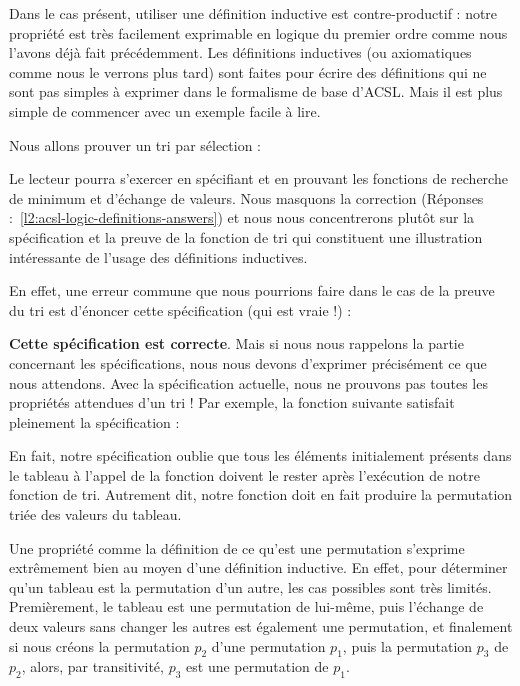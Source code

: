 Dans le cas présent, utiliser une définition inductive est contre-productif :
notre propriété est très facilement exprimable en logique du premier ordre comme
nous l'avons déjà fait précédemment. Les définitions inductives (ou axiomatiques
comme nous le verrons plus tard) sont faites pour écrire des définitions qui ne
sont pas simples à exprimer dans le formalisme de base d'ACSL. Mais il est plus
simple de commencer avec un exemple facile à lire.




\label{l3:acsl-logic-definitions-inductive-sort}




Nous allons prouver un tri par sélection :





Le lecteur pourra s'exercer en spécifiant et en prouvant les fonctions de
recherche de minimum et d'échange de valeurs. Nous masquons la correction
(Réponses :~\ref{l2:acsl-logic-definitions-answers}) et nous nous concentrerons
plutôt sur la spécification et la preuve de la fonction de tri qui constituent
une illustration intéressante de l'usage des définitions inductives.


En effet, une erreur commune que nous pourrions faire dans le cas de la preuve
du tri est d'énoncer cette spécification (qui est vraie !) :






\textbf{Cette spécification est correcte}. Mais si nous nous rappelons la
partie concernant les spécifications, nous nous devons d'exprimer précisément ce
que nous attendons. Avec la spécification actuelle, nous ne prouvons pas toutes
les propriétés attendues d'un tri ! Par exemple, la fonction suivante satisfait
pleinement la spécification :






En fait, notre spécification oublie que tous les éléments initialement
présents dans le tableau à l'appel de la fonction doivent
le rester après l'exécution de notre fonction de tri. Autrement dit, notre
fonction doit en fait produire la permutation triée des valeurs du tableau.



Une propriété comme la définition de ce qu'est une permutation s'exprime
extrêmement bien au moyen d'une définition inductive. En effet, pour
déterminer qu'un tableau est la permutation d'un autre, les cas possibles sont très limités.
Premièrement, le tableau est une permutation de lui-même, puis l'échange de
deux valeurs sans changer les autres est également une permutation, et
finalement si nous créons la permutation $p_2$ d'une permutation $p_1$, puis
la permutation $p_3$ de $p_2$, alors, par transitivité, $p_3$ est une permutation
de $p_1$.



